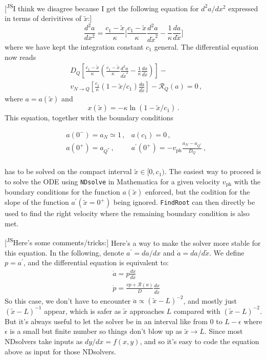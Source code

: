 \documentclass[superscriptaddress,amsmath,floatfix,aps,prc,twocolumn]{revtex4-1}
\newcommand{\JS}[1]{\textsf{\color{violet} {[\textsuperscript{JS}#1]}}}
\begin{document}
\JS{I think we disagree because I get the following equation for $d^2a/dx^2$ expressed in terms of derivitives of $\tilde{x}$:}
\begin{equation}
    \frac{d^2 a}{dx^2} = \frac{c_1 - \tilde{x}}{\kappa}\bigg[ \frac{c_1 - \tilde{x}}{\kappa}\frac{d^2 a}{d\tilde{x}^2} - \frac{1}{\kappa}\frac{da}{d\tilde{x}} \bigg]
\end{equation}
where we have kept the integration constant $c_1$ general.
The differential equation now reads
\begin{align}
       &D_Q\left[\frac{c_1 - \tilde{x}}{\kappa}\left( \frac{c_1 - \tilde{x}}{\kappa}\frac{d^2 a}{d\tilde{x}^2} - \frac{1}{\kappa}\frac{da}{d\tilde{x}} \right)\right] - \nonumber \\
    & v_{N\to Q}\left[\frac{c_1}{\kappa}(1-\tilde{x}/c_1)\frac{da}{d\tilde{x}}\right] - \mathcal{R}_Q(a) = 0 \, ,
\end{align}
where $a=a(\tilde{x})$ and 
\begin{equation}
    x(\tilde{x})=-\kappa\ln(1-\tilde{x}/c_1) \, .
\end{equation}
This equation, together with the boundary conditions

\begin{align}
& a(0^-) = a_N\simeq 1 \, , & a(c_1) = 0 \, ,\\
& a(0^+) = a_{Q^*}\, , & a^\prime(0^+) = -v_\mathrm{ph}\frac{a_N - a_{Q^*}}{D_Q} \, ,\\
\end{align}

has to be solved on the compact interval $\tilde{x}\in [0,c_1)$. The easiest way to proceed is to solve the ODE using \texttt{NDsolve} in Mathematica for a given velocity $v_\mathrm{ph}$ with the boundary conditions for the function $a(\tilde{x})$ enforced, but the codition for the slope of the function $a^\prime(\tilde{x}=0^+)$ being ignored. \texttt{FindRoot} can then directly be used to find the right velocity where the remaining boundary condition is also met. 

\JS{Here's some comments/tricks:}
Here's a way to make the solver more stable for this equation. In the following, denote $a^\prime = da/dx$ and $\dot{a} = da/d\tilde{x}$. We define $p = a^\prime$, and the differential equation is equivalent to:
\begin{align}
& \dot{a} = p \frac{dx}{d\tilde{x}}\\
& \dot{p} = \frac{vp + \mathcal{R}(a)}{D}\frac{dx}{d\tilde{x}}
\end{align}
So this case, we don't have to encounter $\ddot{a}\propto (\tilde{x} - L)^{-2}$, and mostly just $(\tilde{x} - L)^{-1}$ appear, which is safer as $\tilde{x}$ approaches $L$ compared with $(\tilde{x} - L)^{-2}$. But it's always useful to let the solver be in an interval like from 0 to $L - \epsilon$ where $\epsilon$ is a small but finite number so things don't blow up as $\tilde{x}\to L$. 
Since most NDsolvers take inputs as $dy/dx = f(x,y)$, and so it's easy to code the equation above as input for those NDsolvers. 
\end{document}
